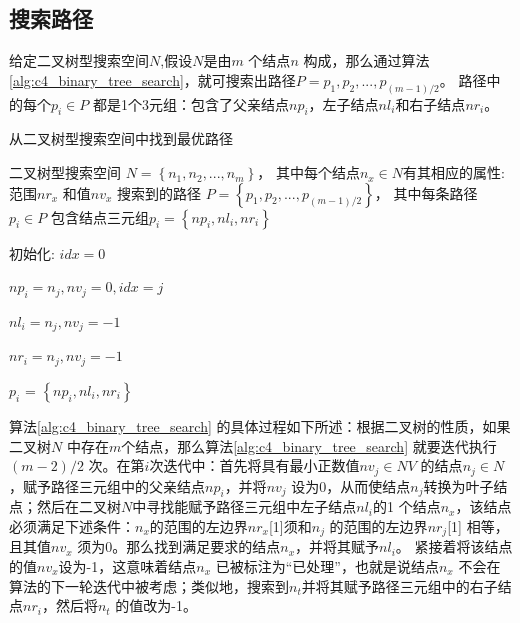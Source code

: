         \subsection{搜索路径}

        给定二叉树型搜索空间$N$,假设$N$是由$m$ 个结点$n$ 构成，那么通过算法\ref{alg:c4_binary_tree_search}，就可搜索出路径$P={p_1,p_2,...,p_{(m-1)/2}}$。 路径中的每个$p_i \in P$ 都是1个3元组：包含了父亲结点$np_i$，左子结点$nl_i$和右子结点$nr_i$。

        \begin{algorithm}[!h]
    	\renewcommand{\algorithmicrequire}{\textbf{输入:}}	
        \renewcommand{\algorithmicensure}{\textbf{输出:}}
    	\caption{从二叉树型搜索空间中找到最优路径}
    	\label{alg:c4_binary_tree_search}
    	\begin{algorithmic}[1]
    		\REQUIRE 二叉树型搜索空间 $N=\left\{n_1,n_2,...,n_m\right\}$， 其中每个结点$n_x \in N$有其相应的属性: 范围$nr_x$ 和值$nv_x$
    		\ENSURE 搜索到的路径 $P=\left\{p_1,p_2,...,p_{(m-1)/2}\right\}$， 其中每条路径$p_{i} \in P$ 包含结点三元组$p_{i}=\left\{np_{i},nl_{i},nr_{i}\right\}$

          \STATE 初始化: $idx=0$

          \STATE $np_i = n_j, nv_j = 0, idx = j$
          \ENDIF

          \STATE $nl_i = n_j, nv_j = -1$
          \ENDIF

          \STATE $nr_i = n_j, nv_j = -1$
          \ENDIF

          \ENDFOR

          \STATE $p_{i}$ = $\left\{ np_{i},nl_{i},nr_{i} \right\}$

          \ENDFOR
    	  \end{algorithmic}
        \end{algorithm}

        算法\ref{alg:c4_binary_tree_search} 的具体过程如下所述：根据二叉树的性质，如果二叉树$N$ 中存在$m$个结点，那么算法\ref{alg:c4_binary_tree_search} 就要迭代执行$(m-2)/2$ 次。在第$i$次迭代中：首先将具有最小正数值$nv_j \in NV$ 的结点$n_j \in N$，赋予路径三元组中的父亲结点$np_i$，并将$nv_j$ 设为0，从而使结点$n_j$转换为叶子结点；然后在二叉树$N$中寻找能赋予路径三元组中左子结点$nl_i$的1 个结点$n_x$，该结点必须满足下述条件：$n_x$的范围的左边界$nr_x$[1]须和$n_j$ 的范围的左边界$nr_j$[1] 相等，且其值$nv_x$ 须为0。那么找到满足要求的结点$n_x$，并将其赋予$nl_i$。 紧接着将该结点的值$nv_x$设为-1，这意味着结点$n_x$ 已被标注为``已处理''，也就是说结点$n_x$ 不会在算法的下一轮迭代中被考虑；类似地，搜索到$n_t$并将其赋予路径三元组中的右子结点$nr_i$，然后将$n_t$ 的值改为-1。

